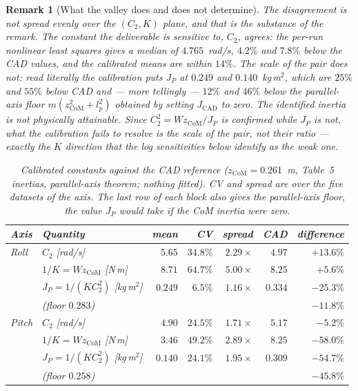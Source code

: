 \documentclass[10pt]{article}
\newtheorem{remark}{Remark}
\begin{document}
\begin{remark}[What the valley does and does not determine]
The disagreement is not spread evenly over the $(C_2, K)$ plane, and
that is the substance of the remark. The constant the deliverable is
sensitive to, $C_2$, agrees: the per-run nonlinear least squares gives
a median of $4.765$~rad/s, $4.2\%$ and $7.8\%$ below the CAD values,
and the calibrated means are within $14\%$. The scale of the pair does
not: read literally the calibration puts $J_P$ at $0.249$ and
$0.140$~kg\,m$^2$, which are $25\%$ and $55\%$ below CAD and --- more
tellingly --- $12\%$ and $46\%$ below the parallel-axis floor
$m(z_{\mathrm{CoM}}^2 + l_p^2)$ obtained by setting $J_{\mathrm{CAD}}$
to zero. \emph{The identified inertia is not physically attainable.}
Since $C_2^2 = W z_{\mathrm{CoM}}/J_P$ is confirmed while $J_P$ is not,
what the calibration fails to resolve is the scale of the pair, not
their ratio --- exactly the $K$ direction that the log sensitivities
below identify as the weak one.

\begin{table}[h]
\centering
\caption{Calibrated constants against the CAD reference
($z_{\mathrm{CoM}} = 0.261$~m, Table~5 inertias, parallel-axis
theorem; nothing fitted). CV and spread are over the five datasets of
the axis. The last row of each block also gives the parallel-axis
floor, the value $J_P$ would take if the CoM inertia were zero.}
\label{tab:phys}
\small
\setlength{\tabcolsep}{6pt}
\begin{tabular}{@{}llrrrrr@{}}
\hline
Axis & Quantity & mean & CV & spread & CAD & difference \\
\hline
Roll  & $C_2$ [rad/s]                     & $5.65$  & $34.8\%$ & $2.29\times$ & $4.97$  & $+13.6\%$ \\
      & $1/K = W z_{\mathrm{CoM}}$ [N\,m] & $8.71$  & $64.7\%$ & $5.00\times$ & $8.25$  & $+5.6\%$ \\
      & $J_P = 1/(K C_2^2)$ [kg\,m$^2$]   & $0.249$ & $6.5\%$  & $1.16\times$ & $0.334$ & $-25.3\%$ \\
      & \quad (floor $0.283$)             &         &          &              &         & $-11.8\%$ \\
\hline
Pitch & $C_2$ [rad/s]                     & $4.90$  & $24.5\%$ & $1.71\times$ & $5.17$  & $-5.2\%$ \\
      & $1/K = W z_{\mathrm{CoM}}$ [N\,m] & $3.46$  & $49.2\%$ & $2.89\times$ & $8.25$  & $-58.0\%$ \\
      & $J_P = 1/(K C_2^2)$ [kg\,m$^2$]   & $0.140$ & $24.1\%$ & $1.95\times$ & $0.309$ & $-54.7\%$ \\
      & \quad (floor $0.258$)             &         &          &              &         & $-45.8\%$ \\
\hline
\end{tabular}
\end{table}


\end{remark}
\end{document}
